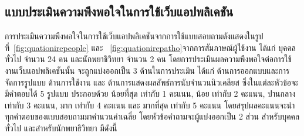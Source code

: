 \documentclass[12pt,oneside,openright,a4paper]{cpe-thai-project}
\begin{document}
\subsection{แบบประเมินความพึงพอใจในการใช้เว็บแอปพลิเคชัน}
การประเมินความพึงพอใจในการใช้เว็บแอปพลิเคชันจากการใช้แบบสอบถามดังแสดงในรูปที่~\ref{fig:quationirepeople} และ ~\ref{fig:quationirepatho}จากการสัมภาษณ์ผู้ใช้งาน ได้แก่ บุคคลทั่วไป จำนวน 24 คน และนักพยาธิวิทยา จำนวน 2 คน โดยการประเมินผลความพึงพอใจต่อการใช้งานเว็บแอปพลิเคชันนั้น จะถูกแบ่งออกเป็น 3 ด้านในการประเมิน ได้แก่ ด้านการออกแบบและการจัดการรูปแบบ ด้านการใช้งาน และ ด้านการแสดงผลลัพธ์การนับจำนวนนิวเคลียส ซึ่งในแต่ละหัวข้อจะมีคำตอบได้ 5 รูปแบบ ประกอบด้วย น้อยที่สุด เท่ากับ 1 คะแนน, น้อย เท่ากับ 2 คะแนน, ปานกลาง เท่ากับ 3 คะแนน, มาก เท่ากับ 4 คะแนน และ มากที่สุด เท่ากับ 5 คะแนน โดยสรุปผลคะแนนจะนำทุกคำตอบของแบบสอบถามมาคำนวนค่าเฉลี่ย โดยหัวข้อคำถามจะผู้แบ่งออกเป็น 2 ส่วน สำหรับบุคคลทั่วไป และสำหรับนักพยาธิวิทยา มีดังนี้
\end{document}
